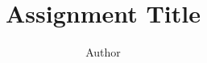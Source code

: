 \documentclass[]{Assignment-Format}
\title{Assignment Title}
\author{Author}
\begin{document}

\setheader%


\begin{question}

\end{question}

\begin{answer}

\end{answer}


\end{document}
